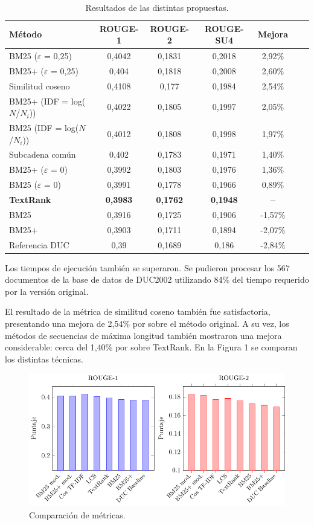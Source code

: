 \documentclass[a4paper]{article}
\begin{document}
\begin{table}
\caption{Resultados de las distintas propuestas.}
\begin{center}
\begin{tabular}{l*{5}{c}r}
\hline
\rule{0pt}{12pt}
Método & ROUGE-1 & ROUGE-2 & ROUGE-SU4 & Mejora \\[2pt]
\hline\rule{0pt}{12pt}\mbox{}\par\nobreak
BM25 ($\varepsilon$ = 0,25) & 0,4042 & 0,1831 & 0,2018 & 2,92\% \\
BM25+ ($\varepsilon$ = 0,25) & 0,404 & 0,1818 & 0,2008 & 2,60\% \\
Similitud coseno & 0,4108 & 0,177 & 0,1984 & 2,54\% \\
BM25+ (IDF = log($N$/$N_i$)) & 0,4022 & 0,1805 & 0,1997 & 2,05\% \\ 
BM25 (IDF = log($N$/$N_i$)) & 0,4012 & 0,1808 & 0,1998 & 1,97\% \\ 
Subcadena común & 0,402 & 0,1783 & 0,1971 & 1,40\% \\
BM25+ ($\varepsilon$ = 0) & 0,3992 & 0,1803 & 0,1976 & 1,36\% \\ 
BM25 ($\varepsilon$ = 0) & 0,3991 & 0,1778 & 0,1966 & 0,89\% \\
\textbf{TextRank} & \textbf{0,3983} & \textbf{0,1762} & \textbf{0,1948} & \textbf{--}\\
BM25 & 0,3916 & 0,1725 & 0,1906 & -1,57\% \\
BM25+ & 0,3903 & 0,1711 & 0,1894 & -2,07\% \\
Referencia DUC & 0,39 & 0,1689 & 0,186 & -2,84\% \\ [2pt]
\hline
\end{tabular}
\end{center}
\end{table}


Los tiempos de ejecución también se superaron. Se pudieron procesar los 567 documentos de la base de datos de DUC2002 utilizando 84\% del tiempo requerido por la versión original.

El resultado de la métrica de similitud coseno también fue satisfactoria, presentando una mejora de 2,54\% por sobre el método original. A su vez, los métodos de secuencias de máxima longitud también mostraron una mejora considerable: cerca del 1,40\% por sobre TextRank. En la Figura 1 se comparan los distintas técnicas.

\begin{figure}[h!]
    \centering
    \includegraphics[width=1\textwidth]{rouge-scores.pdf}
    \caption{Comparación de métricas.}
\end{figure}
\end{document}
